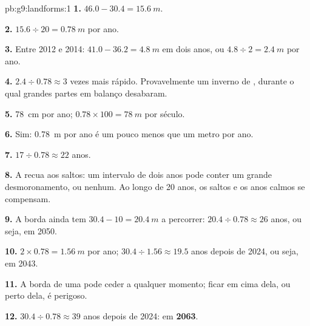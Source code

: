 \begin{solution}{pb:g9:landforms:1}
\textbf{1.} $46.0 - 30.4 = \qty{15.6}{m}$.

\textbf{2.} $15.6 \div 20 = \qty{0.78}{m}$ por ano.

\textbf{3.} Entre 2012 e 2014: $41.0 - 36.2 = \qty{4.8}{m}$ em dois
anos, ou $4.8 \div 2 = \qty{2.4}{m}$ por ano.

\textbf{4.} $2.4 \div 0.78 \approx 3$ vezes mais rápido. Provavelmente
um inverno de , durante o qual grandes partes em balanço
desabaram.

\textbf{5.} \qty{78}{cm} por ano; $0.78 \times 100 = \qty{78}{m}$ por
século.

\textbf{6.} Sim: \qty{0.78}{m} por ano é um pouco menos que um metro por ano.

\textbf{7.} $17 \div 0.78 \approx 22$ anos.

\textbf{8.} A  recua aos saltos: um intervalo de dois anos pode
conter um grande desmoronamento, ou nenhum. Ao longo de 20 anos, os
saltos e os anos calmos se compensam.

\textbf{9.} A borda ainda tem $30.4 - 10 = \qty{20.4}{m}$ a percorrer: $20.4 \div 0.78
\approx 26$ anos, ou seja, em 2050.

\textbf{10.} $2 \times 0.78 = \qty{1.56}{m}$ por ano; $30.4 \div 1.56
\approx 19.5$ anos depois de 2024, ou seja, em 2043.

\textbf{11.} A borda de uma  pode ceder a qualquer momento; ficar
em cima dela, ou perto dela, é perigoso.

\textbf{12.} $30.4 \div 0.78 \approx 39$ anos depois de 2024: em
\textbf{2063}.
\end{solution}
